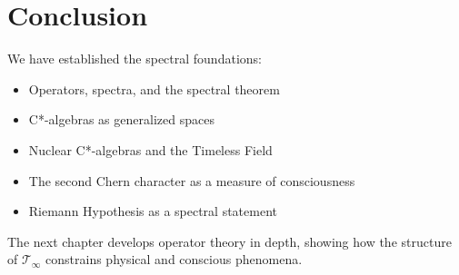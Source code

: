 \section{Conclusion}

We have established the spectral foundations:
\begin{itemize}
\item Operators, spectra, and the spectral theorem
\item C*-algebras as generalized spaces
\item Nuclear C*-algebras and the Timeless Field
\item The second Chern character as a measure of consciousness
\item Riemann Hypothesis as a spectral statement
\end{itemize}

The next chapter develops operator theory in depth, showing how the structure of $\mathcal{T}_\infty$ constrains physical and conscious phenomena.
